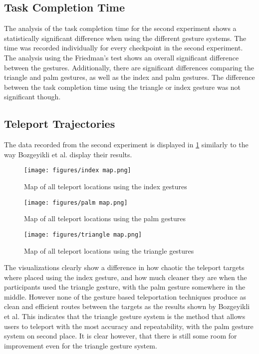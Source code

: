 \subsection{Task Completion Time}
The analysis of the task completion time for the second experiment shows a statistically significant difference when using the different gesture systems. The time was recorded individually for every checkpoint in the second experiment. The analysis using the Friedman’s test shows an overall significant difference between the gestures. Additionally, there are significant differences comparing the triangle and palm gestures, as well as the index and palm gestures. The difference between the task completion time using the triangle or index gesture was not significant though.


\subsection{Teleport Trajectories}
The data recorded from the second experiment is displayed in \ref{fig:exp2maps} similarly to the way Bozgeyikli et al. %
display their results. 

\begin{figure}[!htb]
        \texttt{[image: figures/index map.png]}
        \caption{Map of all teleport locations using the index gestures}\label{fig:map_index}
    \endminipage\hfill
        \texttt{[image: figures/palm map.png]}
        \caption{Map of all teleport locations using the palm gestures}\label{fig:map_palm}
    \endminipage\hfill
        \texttt{[image: figures/triangle map.png]}
        \caption{Map of all teleport locations using the triangle gestures}\label{fig:map_triangle}
        \label{fig:exp2maps}
    \endminipage
\end{figure}
    
The visualizations clearly show a difference in how chaotic the teleport targets where placed using the index gesture, and how much cleaner they are when the participants used the triangle gesture, with the palm gesture somewhere in the middle. However none of the gesture based teleportation techniques produce as clean and efficient routes between the targets as the results shown by Bozgeyikli et al. This indicates that the triangle gesture system is the method that allows users to teleport with the most accuracy and repeatability, with the palm gesture system on second place. It is clear however, that there is still some room for improvement even for the triangle gesture system. 

